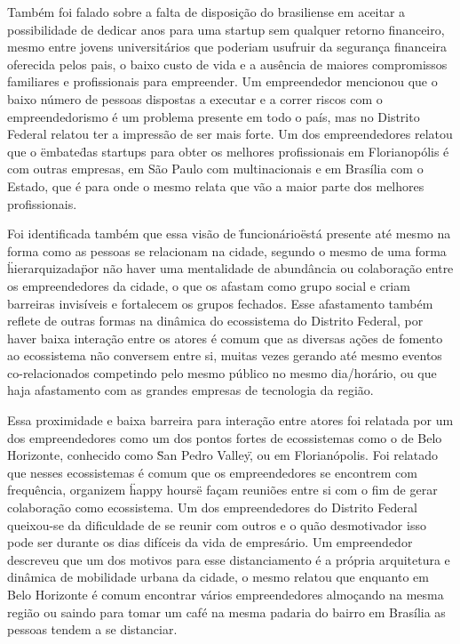 Também foi falado sobre a falta de disposição do brasiliense em aceitar a possibilidade de dedicar anos para uma startup sem qualquer retorno financeiro, mesmo entre jovens universitários que poderiam usufruir da segurança financeira oferecida pelos pais, o baixo custo de vida e a ausência de maiores compromissos familiares e profissionais para empreender. Um empreendedor mencionou que o baixo número de pessoas dispostas a executar e a correr riscos com o empreendedorismo é um problema presente em todo o país, mas no Distrito Federal relatou ter a impressão de ser mais forte. Um dos empreendedores relatou que o \"embate\" das startups para obter os melhores profissionais em Florianopólis é com outras empresas, em São Paulo com multinacionais e em Brasília com o Estado, que é para onde o mesmo relata que vão a maior parte dos melhores profissionais.

Foi identificada também que essa visão de \"funcionário\" está presente até mesmo na forma como as pessoas se relacionam na cidade, segundo o mesmo de uma forma \"hierarquizada\" por não haver uma mentalidade de abundância ou colaboração entre os empreendedores da cidade, o que os afastam como grupo social e criam barreiras invisíveis e fortalecem os grupos fechados. Esse afastamento também reflete de outras formas na dinâmica do ecossistema do Distrito Federal, por haver baixa interação entre os atores é comum que as diversas ações de fomento ao ecossistema não conversem entre si, muitas vezes gerando até mesmo eventos co-relacionados competindo pelo mesmo público no mesmo dia/horário, ou que haja afastamento com as grandes empresas de tecnologia da região.

Essa proximidade e baixa barreira para interação entre atores foi relatada por um dos empreendedores como um dos pontos fortes de ecossistemas como o de Belo Horizonte, conhecido como \"San Pedro Valley\", ou em Florianópolis. Foi relatado que nesses ecossistemas é comum que os empreendedores se encontrem com frequência, organizem \"happy hours\" e façam reuniões entre si com o fim de gerar colaboração como ecossistema. Um dos empreendedores do Distrito Federal queixou-se da dificuldade de se reunir com outros e o quão desmotivador isso pode ser durante os dias difíceis da vida de empresário. Um empreendedor descreveu que um dos motivos para esse distanciamento é a própria arquitetura e dinâmica de mobilidade urbana da cidade, o mesmo relatou que enquanto em Belo Horizonte é comum encontrar vários empreendedores almoçando na mesma região ou saindo para tomar um café na mesma padaria do bairro em Brasília as pessoas tendem a se distanciar.

